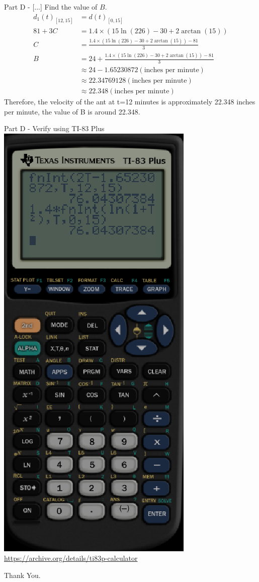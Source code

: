 \documentclass{beamer}
\begin{document}
\begin{frame}{Part D - [...] Find the value of $B$.}
    \begin{align*}
    d_1(t)_{[12,15]} &= d(t)_{[0,15]}\\
    81+3C &=1.4\times (15\ln(226)-30+2\arctan(15))\\
    C &= \frac{1.4\times (15\ln(226)-30+2\arctan(15))-81}{3}\\
    B &= 24 + \frac{1.4\times (15\ln(226)-30+2\arctan(15))-81}{3}\\
    &\approx 24-1.65230872 (\text{inches per minute})\\
    &\approx 22.34769128 (\text{inches per minute})\\
    &\approx 22.348 (\text{inches per minute})
    \end{align*}
    Therefore, the velocity of the ant at t=12 minutes is approximately 22.348 inches per minute, the value of B is around 22.348. 
\end{frame}

\begin{frame}{Part D - Verify using TI-83 Plus}
    \includegraphics[scale=0.33]{8}\\
    \tiny \url{https://archive.org/details/ti83p-calculator}
\end{frame}








\begin{frame}
    \large Thank You.     
\end{frame}
\end{document}
